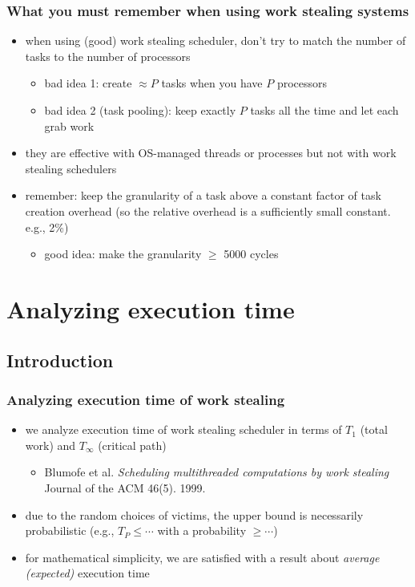 \documentclass[12pt,dvipdfmx]{beamer}
\newcommand{\ao}[1]{{\color{blue}#1}}
\newcommand{\aka}[1]{{\color{red}#1}}
\begin{document}
\begin{frame}
\frametitle{What you must remember when using work stealing systems}
\begin{itemize}
\item when using (good) work stealing scheduler,
  don't try to match the number 
  of tasks to the number of processors
  \begin{itemize}
  \item \aka{bad idea 1:} 
    create $\approx P$ tasks when you have $P$ processors
  \item \aka{bad idea 2 (task pooling):}
    keep exactly $P$ tasks all the time and let each grab work
  \end{itemize}
\item they are effective with OS-managed threads or processes
  but not with work stealing schedulers

\item \ao{remember:} keep the granularity of a task 
  above a constant factor of task creation overhead
  (so the relative overhead is a sufficiently small constant.
  e.g., 2\%)
  \begin{itemize}
  \item \ao{good idea:} 
    make the granularity $\geq$ 5000 cycles
  \end{itemize}
\end{itemize}
\end{frame}

\section{Analyzing execution time}

\subsection{Introduction}

\begin{frame}
\frametitle{Analyzing execution time of work stealing}
\begin{itemize}
\item we analyze execution time of work stealing scheduler 
in terms of $T_1$ (total work) and $T_\infty$ (critical path)
\begin{itemize}
\item []
{\footnotesize Blumofe et al. {\it Scheduling multithreaded
    computations by work stealing} Journal of the
  ACM 46(5). 1999.}
\end{itemize}

\item due to the random choices of victims, the upper
  bound is necessarily probabilistic
  {\footnotesize (e.g., $T_P \leq \cdots$ with a
    probability $\geq \cdots$)}

\item for mathematical simplicity, 
we are satisfied with a result about 
\ao{\emph{average (expected)}} execution time
\end{itemize}
\end{frame}
\end{document}
